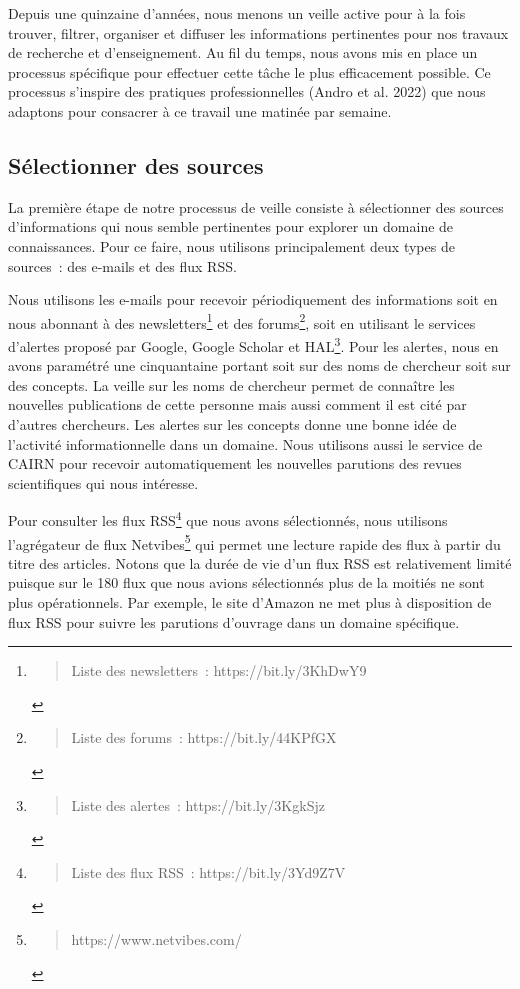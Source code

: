 \documentclass[
  letterpaper,
  DIV=11,
  numbers=noendperiod]{scrreprt}
\begin{document}
Depuis une quinzaine d'années, nous menons un veille active pour à la
fois trouver, filtrer, organiser et diffuser les informations
pertinentes pour nos travaux de recherche et d'enseignement. Au fil du
temps, nous avons mis en place un processus spécifique pour effectuer
cette tâche le plus efficacement possible. Ce processus s'inspire des
pratiques professionnelles (Andro et al. 2022) que nous adaptons pour
consacrer à ce travail une matinée par semaine.

\hypertarget{sec-selectSources}{%
\subsection{Sélectionner des sources}\label{sec-selectSources}}

La première étape de notre processus de veille consiste à sélectionner
des sources d'informations qui nous semble pertinentes pour explorer un
domaine de connaissances. Pour ce faire, nous utilisons principalement
deux types de sources~: des e-mails et des flux RSS.

Nous utilisons les e-mails pour recevoir périodiquement des informations
soit en nous abonnant à des newsletters\footnote{\begin{quote}
  Liste des newsletters~: https://bit.ly/3KhDwY9
  \end{quote}} et des forums\footnote{\begin{quote}
  Liste des forums~: https://bit.ly/44KPfGX
  \end{quote}}, soit en utilisant le services d'alertes proposé par
Google, Google Scholar et HAL\footnote{\begin{quote}
  Liste des alertes~: https://bit.ly/3KgkSjz
  \end{quote}}. Pour les alertes, nous en avons paramétré une
cinquantaine portant soit sur des noms de chercheur soit sur des
concepts. La veille sur les noms de chercheur permet de connaître les
nouvelles publications de cette personne mais aussi comment il est cité
par d'autres chercheurs. Les alertes sur les concepts donne une bonne
idée de l'activité informationnelle dans un domaine. Nous utilisons
aussi le service de CAIRN pour recevoir automatiquement les nouvelles
parutions des revues scientifiques qui nous intéresse.

Pour consulter les flux RSS\footnote{\begin{quote}
  Liste des flux RSS~: https://bit.ly/3Yd9Z7V
  \end{quote}} que nous avons sélectionnés, nous utilisons l'agrégateur
de flux Netvibes\footnote{\begin{quote}
  https://www.netvibes.com/
  \end{quote}} qui permet une lecture rapide des flux à partir du titre
des articles. Notons que la durée de vie d'un flux RSS est relativement
limité puisque sur le 180 flux que nous avions sélectionnés plus de la
moitiés ne sont plus opérationnels. Par exemple, le site d'Amazon ne met
plus à disposition de flux RSS pour suivre les parutions d'ouvrage dans
un domaine spécifique.
\end{document}
